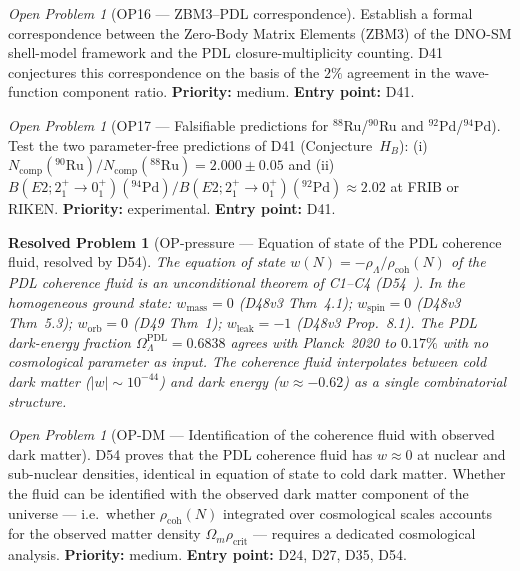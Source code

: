 \documentclass[11pt,a4paper]{article}
\newtheorem{resolvedproblem}{Resolved Problem}
\theoremstyle{plain}
\theoremstyle{definition}
\theoremstyle{remark}
\newtheorem{openproblem}[theorem]{Open Problem}
\newcommand{\rhocoh}{\rho_{\mathrm{coh}}}
\begin{document}
\begin{openproblem}[OP16 --- ZBM3--PDL correspondence]
\label{op:ZBM3}
Establish a formal correspondence between the Zero-Body Matrix Elements (ZBM3) of the DNO-SM shell-model framework and the PDL closure-multiplicity counting. D41 conjectures this correspondence on the basis of the $2\%$ agreement in the wave-function component ratio. \textbf{Priority:} medium. \textbf{Entry point:} D41.
\end{openproblem}

\begin{openproblem}[OP17 --- Falsifiable predictions for $^{88}$Ru/$^{90}$Ru and $^{92}$Pd/$^{94}$Pd]
\label{op:FRIB}
Test the two parameter-free predictions of D41 (Conjecture~$H_B$): (i) $N_{\mathrm{comp}}(^{90}\mathrm{Ru})/N_{\mathrm{comp}}(^{88}\mathrm{Ru})=2.000\pm0.05$ and (ii) $B(E2;2^+_1\!\to\!0^+_1)(^{94}\mathrm{Pd})/B(E2;2^+_1\!\to\!0^+_1)(^{92}\mathrm{Pd})\approx 2.02$ at FRIB or RIKEN. \textbf{Priority:} experimental. \textbf{Entry point:} D41.
\end{openproblem}

\begin{resolvedproblem}[OP-pressure --- Equation of state of the PDL coherence fluid, resolved by D54]
\label{op:pressure}
The equation of state $w(N) = -\rho_\Lambda/\rhocoh(N)$ of the PDL coherence fluid is an unconditional theorem of C1--C4 (D54~\cite{D54}). In the homogeneous ground state: $w_{\mathrm{mass}} = 0$ (D48v3 Thm~4.1); $w_{\mathrm{spin}} = 0$ (D48v3 Thm~5.3); $w_{\mathrm{orb}} = 0$ (D49 Thm~1); $w_{\mathrm{leak}} = -1$ (D48v3 Prop.~8.1). The PDL dark-energy fraction $\Omega_\Lambda^{\mathrm{PDL}} = 0.6838$ agrees with Planck~2020 to $0.17\%$ with no cosmological parameter as input. The coherence fluid interpolates between cold dark matter ($|w| \sim 10^{-44}$) and dark energy ($w \approx -0.62$) as a single combinatorial structure.
\end{resolvedproblem}

\begin{openproblem}[OP-DM --- Identification of the coherence fluid with observed dark matter]
\label{op:DM}
D54 proves that the PDL coherence fluid has $w \approx 0$ at nuclear and sub-nuclear densities, identical in equation of state to cold dark matter. Whether the fluid can be identified with the observed dark matter component of the universe --- i.e.\ whether $\rhocoh(N)$ integrated over cosmological scales accounts for the observed matter density $\Omega_m \rho_{\mathrm{crit}}$ --- requires a dedicated cosmological analysis. \textbf{Priority:} medium. \textbf{Entry point:} D24, D27, D35, D54.
\end{openproblem}
\end{document}
